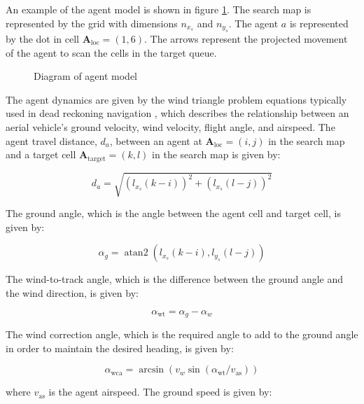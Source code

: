 \documentclass[conference]{IEEEtran}
\DeclareMathOperator{\atantwo}{atan2}
\begin{document}
An example of the agent model is shown in figure \ref{fig:diagram_agent_model}.
The search map is represented by the grid with dimensions $n_{x_{s}}$ and $n_{y_{s}}$.
The agent $a$ is represented by the dot in cell $\bm{A}_{\text{loc}} = (1,6)$.
The arrows represent the projected movement of the agent to scan the cells in the target queue.

\begin{figure}
    \centering
    
    \caption{Diagram of agent model}
    \label{fig:diagram_agent_model}
\end{figure}

The agent dynamics are given by the wind triangle problem equations typically used in dead reckoning navigation \cite{daidzic2016general}, which describes the relationship between an aerial vehicle's ground velocity, wind velocity, flight angle, and airspeed.
The agent travel distance, $d_{a}$, between an agent at $\bm{A}_{\text{loc}} = (i,j)$ in the search map and a target cell $\bm{A}_{\text{target}} = (k,l)$ in the search map is given by:

\begin{equation}
    d_{a} = \sqrt{ (l_{x_{s}} (k - i) )^{2} + (l_{x_{s}} (l-j))^{2}}
\end{equation}

The ground angle, which is the angle between the agent cell and target cell, is given by:

\begin{equation}
    \alpha_{g} = \atantwo (l_{x_{s}}(k - i), l_{y_{s}}(l - j))
\end{equation}

The wind-to-track angle, which is the difference between the ground angle and the wind direction, is given by:

\begin{equation}
    \alpha_{\text{wt}} = \alpha_{g} - \alpha_{w}
\end{equation}

The wind correction angle, which is the required angle to add to the ground angle in order to maintain the desired heading, is given by:

\begin{equation}
    \alpha_{\text{wca}} = \arcsin (v_{w} \sin (\alpha_{\text{wt}} / v_{\text{as}}))
\end{equation}

where $v_{\text{as}}$ is the agent airspeed.
The ground speed is given by:
\end{document}
